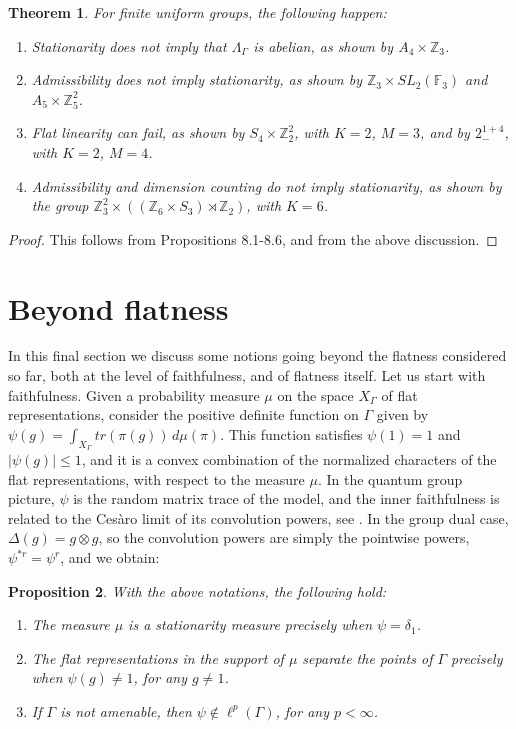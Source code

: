 \documentclass[12pt]{amsart}
\newtheorem{theorem}{Theorem}[section]
\newtheorem{proposition}[theorem]{Proposition}
\theoremstyle{definition}
\begin{document}
\begin{theorem}
For finite uniform groups, the following happen:
\begin{enumerate}
\item Stationarity does not imply that $\Lambda_\Gamma$ is abelian, as shown by $A_4\times\mathbb Z_3$.

\item Admissibility does not imply stationarity, as shown by $\mathbb Z_3\times SL_2(\mathbb F_3)$ and $A_5\times\mathbb Z_5^2$.

\item Flat linearity can fail, as shown by $S_4\times\mathbb Z_2^2$, with $K=2$, $M=3$, and by $2^{1+4}_-$, with $K=2$, $M=4$.

\item Admissibility and dimension counting do not imply stationarity, as shown by the group $\mathbb Z_3^2\times((\mathbb Z_6\times S_3)\rtimes\mathbb Z_2)$, with $K=6$.
\end{enumerate}
\end{theorem}

\begin{proof}
This follows from Propositions 8.1-8.6, and from the above discussion.
\end{proof}

\section{Beyond flatness}

In this final section we discuss some notions going beyond the flatness considered so far, both at the level of faithfulness, and of flatness itself. Let us start with faithfulness. Given a probability measure $\mu$ on the space $X_\Gamma$ of flat representations, consider the positive definite function on $\Gamma$ given by $\psi(g)=\int_{X_\Gamma}tr(\pi(g))\,d\mu(\pi)$. This function satisfies $\psi(1)=1$ and $|\psi(g)|\leq1$, and it is a convex combination of the normalized characters of the flat representations, with respect to the measure $\mu$. In the quantum group picture, $\psi$ is the random matrix trace of the model, and the inner faithfulness is related to the Ces\`aro limit of its convolution powers, see \cite{wa3}. In the group dual case, $\Delta(g)=g\otimes g$, so the convolution powers are simply the pointwise powers, $\psi^{*r}=\psi^r$, and we obtain:

\begin{proposition}
With the above notations, the following hold:
\begin{enumerate}
\item The measure $\mu$ is a stationarity measure precisely when $\psi=\delta_1$.

\item The flat representations in the support of $\mu$ separate the points of $\Gamma$ precisely when $\psi(g)\neq1$, for any $g\neq1$.

\item If $\Gamma$ is not amenable, then $\psi\notin\ell^p(\Gamma)$, for any $p<\infty$.
\end{enumerate}
\end{proposition}
\end{document}
